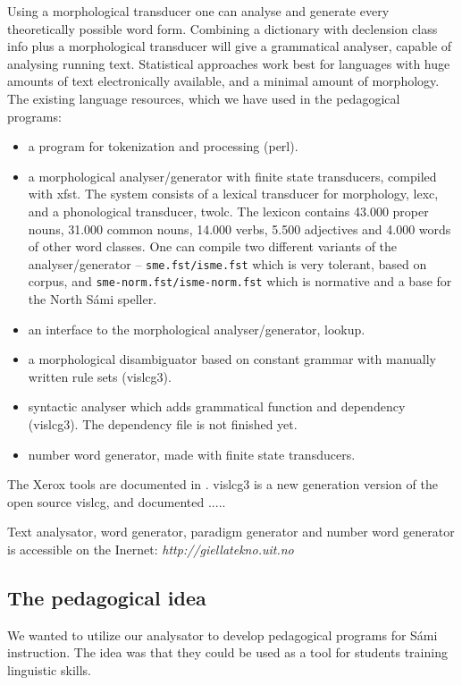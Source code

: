 \documentclass[a4paper,12pt]{article}
\begin{document}
Using a morphological transducer one can analyse and generate every theoretically possible word form. Combining a dictionary with declension class info plus a morphological transducer will give a grammatical analyser, capable of analysing running text. Statistical approaches work best for languages with huge amounts of text electronically available, and a minimal amount of morphology. 
\citep{TT07}
\newpage
The existing language resources, which we have used in the pedagogical programs:
\begin{itemize}
\item a program for tokenization and processing (perl).
\item a morphological analyser/generator with finite state transducers, compiled with xfst. The system consists of a lexical transducer for morphology, lexc, and a phonological transducer, twolc. The lexicon contains 43.000 proper nouns, 31.000 common nouns, 14.000 verbs, 5.500 adjectives and 4.000 words of other word classes. One can compile two different variants of the analyser/generator -- \texttt{sme.fst/isme.fst} which is very tolerant, based on corpus, and \texttt{sme-norm.fst/isme-norm.fst} which is normative and a base for the North Sámi speller.  
\item an interface to the morphological analyser/generator, lookup. 
\item a morphological disambiguator based on constant grammar with manually written rule sets (vislcg3). 
\item syntactic analyser which adds grammatical function and dependency (vislcg3). The dependency file is not finished yet.
\item number word generator, made with finite state transducers.
\end{itemize}

The Xerox tools are documented in \citep{BeesleyKarttunen}. vislcg3 is a new generation version of the open source vislcg, and documented .....

Text analysator, word generator, paradigm generator and number word generator is accessible on the Inernet: \textit{http://giellatekno.uit.no}

\subsection{The pedagogical idea}
We wanted to utilize our analysator to develop pedagogical programs for Sámi instruction. The idea was that they could be used as a tool for students training linguistic skills. 
\end{document}
